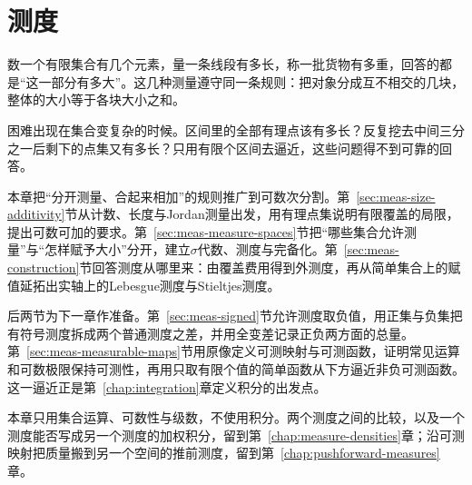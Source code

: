 \chapter{测度}
\label{chap:measure}
\label{chap:measure-spaces}
\label{chap:measures}

数一个有限集合有几个元素，量一条线段有多长，称一批货物有多重，回答的都是“这一部分有多大”。这几种测量遵守同一条规则：把对象分成互不相交的几块，整体的大小等于各块大小之和。

困难出现在集合变复杂的时候。区间里的全部有理点该有多长？反复挖去中间三分之一后剩下的点集又有多长？只用有限个区间去逼近，这些问题得不到可靠的回答。

本章把“分开测量、合起来相加”的规则推广到可数次分割。第~\ref{sec:meas-size-additivity}节从计数、长度与Jordan测量出发，用有理点集说明有限覆盖的局限，提出可数可加的要求。第~\ref{sec:meas-measure-spaces}节把“哪些集合允许测量”与“怎样赋予大小”分开，建立$\sigma$代数、测度与完备化。第~\ref{sec:meas-construction}节回答测度从哪里来：由覆盖费用得到外测度，再从简单集合上的赋值延拓出实轴上的Lebesgue测度与Stieltjes测度。

后两节为下一章作准备。第~\ref{sec:meas-signed}节允许测度取负值，用正集与负集把有符号测度拆成两个普通测度之差，并用全变差记录正负两方面的总量。第~\ref{sec:meas-measurable-maps}节用原像定义可测映射与可测函数，证明常见运算和可数极限保持可测性，再用只取有限个值的简单函数从下方逼近非负可测函数。这一逼近正是第~\ref{chap:integration}章定义积分的出发点。

本章只用集合运算、可数性与级数，不使用积分。两个测度之间的比较，以及一个测度能否写成另一个测度的加权积分，留到第~\ref{chap:measure-densities}章；沿可测映射把质量搬到另一个空间的推前测度，留到第~\ref{chap:pushforward-measures}章。







